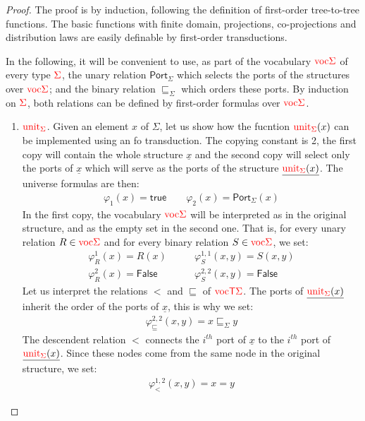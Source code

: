     \begin{proof}
    The proof is by induction, following the definition of first-order tree-to-tree functions. The basic functions with finite domain, projections, co-projections and distribution laws are easily definable by first-order transductions.  
    
    In the following, it will be convenient to use, as part of the vocabulary ${\color{red}{\mathrm{voc}}}{\color{red}{\Sigma}}$ of every type ${\color{red}{\Sigma}}$, the unary relation  $\mathsf{Port}_\Sigma$ which selects the ports of the structures over ${\color{red}{\mathrm{voc}}}{\color{red}{\Sigma}}$; and the binary relation $\sqsubseteq_\Sigma$ which orders these ports. By induction on ${\color{red}{\Sigma}}$, both relations can be defined by first-order formulas over  ${\color{red}{\mathrm{voc}}}{\color{red}{\Sigma}}$.
    
    \begin{enumerate}
    \item ${\color{red}{\mathrm{unit}}}_{\color{red}{\Sigma}}$. Given an element $x$ of $\Sigma$, let us show how the fucntion ${\color{red}{\mathrm{unit}}}_{\color{red}{\Sigma}}(x)$ can be implemented using an fo transduction.  The copying constant is 2,
    the first copy will contain the whole structure $\underline{x}$ and the second copy will select only the ports of $\underline{x}$ which will serve as the ports of the structure $\underline{{\color{red}{\mathrm{unit}}}_{\color{red}{\Sigma}}(x)}$.  The universe formulas are then:
    \begin{align*}
    \varphi_1(x)=\mathsf{true} \qquad \varphi_2(x)=\mathsf{Port}_\Sigma(x)
    \end{align*}
    In the first copy, the vocabulary ${\color{red}{\mathrm{voc}}}{\color{red}{\Sigma}}$ will be interpreted as in the original structure, and as the empty set in the second one. That is, for every unary relation $R\in {\color{red}{\mathrm{voc}}}{\color{red}{\Sigma}}$ and for every binary relation $S \in {\color{red}{\mathrm{voc}}}{\color{red}{\Sigma}}$, we set:
    \begin{align*}
   \varphi_R^{1}(x)=R(x) \quad&\quad \varphi_S^{1,1}(x,y)=S(x,y)\\
   \varphi_R^{2}(x)=\mathsf{False} \quad&\quad \varphi_S^{2,2}(x,y)=\mathsf{False}
\end{align*}      
Let us interpret the relations $<$ and $\sqsubseteq$ of ${\color{red}{\mathrm{voc}}}{\color{red}{\mathsf T}}{\color{red}{\Sigma}}$. The  ports of $\underline{{\color{red}{\mathrm{unit}}}_{\color{red}{\Sigma}}(x)}$ inherit the order of the ports of $\underline{x}$, this is why we set:
\begin{align*}
\varphi_\sqsubseteq^{2,2}(x,y)=x\sqsubseteq_\Sigma y
\end{align*}
The descendent relation $<$ connects the $i^{th}$ port of $\underline{x}$ to the $i^{th}$ port of $\underline{{\color{red}{\mathrm{unit}}}_{\color{red}{\Sigma}}(x)}$. Since these nodes come from the same node in the original structure, we set:
\begin{align*}
\varphi_<^{1,2}(x,y)=x=y
\end{align*}
    \end{enumerate} 
    
     \end{proof}